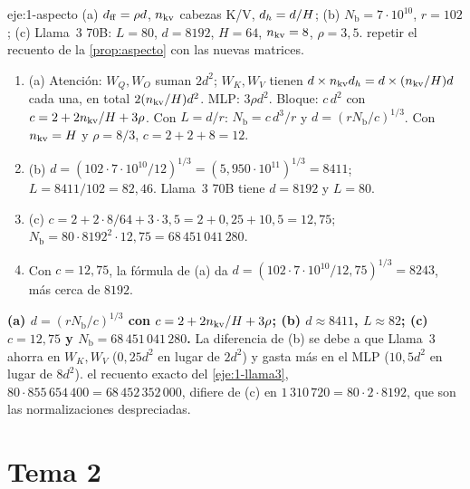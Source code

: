 \begin{solucion}{eje:1-aspecto}
\datos (a) $d_{\mathrm{ff}}=\rho d$, $n_{\mathrm{kv}}$ cabezas K/V, $d_{h}=d/H$; (b) $N_{\mathrm{b}}=7\cdot 10^{10}$, $r=102$; (c) Llama~3 70B: $L=80$, $d=8192$, $H=64$, $n_{\mathrm{kv}}=8$, $\rho=3{,}5$.
\planteamiento repetir el recuento de la \cref{prop:aspecto} con las nuevas matrices.
\pasos
\begin{enumerate}[label=\arabic*.]
  \item (a) Atención: $W_Q,W_O$ suman $2d^{2}$; $W_K,W_V$ tienen $d\times n_{\mathrm{kv}}d_{h}=d\times(n_{\mathrm{kv}}/H)d$ cada una, en total $2(n_{\mathrm{kv}}/H)d^{2}$. MLP: $3\rho d^{2}$. Bloque: $c\,d^{2}$ con $c=2+2n_{\mathrm{kv}}/H+3\rho$. Con $L=d/r$: $N_{\mathrm{b}}=c\,d^{3}/r$ y $d=(rN_{\mathrm{b}}/c)^{1/3}$. Con $n_{\mathrm{kv}}=H$ y $\rho=8/3$, $c=2+2+8=12$.
  \item (b) $d=(102\cdot 7\cdot 10^{10}/12)^{1/3}=(5{,}950\cdot 10^{11})^{1/3}=8411$; $L=8411/102=82{,}46$. Llama~3 70B tiene $d=8192$ y $L=80$.
  \item (c) $c=2+2\cdot 8/64+3\cdot 3{,}5=2+0{,}25+10{,}5=12{,}75$; $N_{\mathrm{b}}=80\cdot 8192^{2}\cdot 12{,}75=68\,451\,041\,280$.
  \item Con $c=12{,}75$, la fórmula de (a) da $d=(102\cdot 7\cdot 10^{10}/12{,}75)^{1/3}=8243$, más cerca de $8192$.
\end{enumerate}
\resultado \textbf{(a) $d=(rN_{\mathrm{b}}/c)^{1/3}$ con $c=2+2n_{\mathrm{kv}}/H+3\rho$; (b) $d\approx 8411$, $L\approx 82$; (c) $c=12{,}75$ y $N_{\mathrm{b}}=68\,451\,041\,280$.} La diferencia de (b) se debe a que Llama~3 ahorra en $W_K,W_V$ ($0{,}25d^{2}$ en lugar de $2d^{2}$) y gasta más en el MLP ($10{,}5d^{2}$ en lugar de $8d^{2}$).
\comprobacion el recuento exacto del \cref{eje:1-llama3}, $80\cdot 855\,654\,400=68\,452\,352\,000$, difiere de (c) en $1\,310\,720=80\cdot 2\cdot 8192$, que son las normalizaciones despreciadas.
\end{solucion}

\section{Tema 2}

